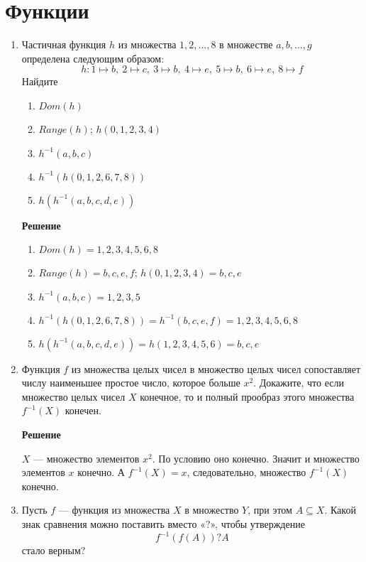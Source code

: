 \documentclass[12pt]{article}
\begin{document}
	\section{Функции}
	\begin{enumerate}[label={\textbf{\arabic{section}.\arabic*}}]
		\item Частичная функция $h$ из множества ${1,2,\dots,8}$ в множестве ${a,b,\dots,g}$ определена следующим образом:
		$$
		h:1\mapsto b,~2\mapsto c,~3\mapsto b,~4\mapsto e,~5\mapsto b,~6\mapsto e,~8\mapsto f
		$$
		Найдите 
		\begin{enumerate}[label=\textbf{\alph*)}]
			\item $Dom(h)$
			\item $Range(h)$; $h({0,1,2,3,4})$
			\item $h^{-1}({a,b,c})$
			\item $h^{-1}(h({0,1,2,6,7,8}))$
			\item $h(h^{-1}({a,b,c,d,e}))$
		\end{enumerate}
	
		\textbf{Решение}
		\begin{enumerate}[label=\textbf{\alph*)}]
			\item $Dom(h) = {1,2,3,4,5,6,8}$
			\item $Range(h) = {b,c,e,f}$; $h({0,1,2,3,4}) = {b,c,e}$
			\item $h^{-1}({a,b,c}) = {1,2,3,5}$
			\item $h^{-1}(h({0,1,2,6,7,8})) = h^{-1}(b,c,e,f) = {1,2,3,4,5,6,8}$
			\item $h(h^{-1}({a,b,c,d,e})) = h({1,2,3,4,5,6}) = {b,c,e}$
		\end{enumerate}
	
		\item Функция $f$ из множества целых чисел в множество целых чисел сопоставляет числу наименьшее простое число, которое больше $x^2$. Докажите, что если множество целых чисел $X$ конечное, то и полный прообраз этого множества$ f^{-1}(X)$ конечен.
		
		\textbf{Решение}
		
		$X$ --- множество элементов $x^2$. По условию оно конечно. Значит и множество элементов $x$ конечно. А $f^{-1}(X) = x$, следовательно, множество $f^{-1}(X)$ конечно.
		
		\item Пусть $f$ --- функция из множества $X$ в множество $Y$, при этом $A\subseteq X$. Какой знак сравнения можно поставить вместо «?», чтобы утверждение
		$$
		f^{-1}(f(A))?A
		$$
		стало верным?
		

\end{enumerate}
\end{document}
